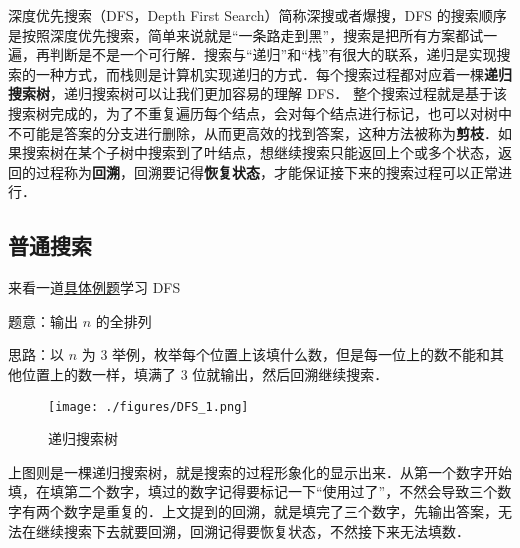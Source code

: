 
深度优先搜索（DFS，Depth First Search）简称深搜或者爆搜，DFS 的搜索顺序是按照深度优先搜索，简单来说就是“一条路走到黑”，搜索是把所有方案都试一遍，再判断是不是一个可行解．搜索与“递归”和“栈”有很大的联系，递归是实现搜索的一种方式，而栈则是计算机实现递归的方式．每个搜索过程都对应着一棵\textbf{递归搜索树}，递归搜索树可以让我们更加容易的理解 DFS．
整个搜索过程就是基于该搜索树完成的，为了不重复遍历每个结点，会对每个结点进行标记，也可以对树中不可能是答案的分支进行删除，从而更高效的找到答案，这种方法被称为\textbf{剪枝}．如果搜索树在某个子树中搜索到了叶结点，想继续搜索只能返回上个或多个状态，返回的过程称为\textbf{回溯}，回溯要记得\textbf{恢复状态}，才能保证接下来的搜索过程可以正常进行．


\subsection{普通搜索}
来看一道\href{https://www.luogu.com.cn/problem/P1706}{具体例题}学习 DFS

题意：输出 $n$ 的全排列

思路：以 $n$ 为 $3$ 举例，枚举每个位置上该填什么数，但是每一位上的数不能和其他位置上的数一样，填满了 $3$ 位就输出，然后回溯继续搜索．

\begin{figure}[ht]
\centering
\texttt{[image: ./figures/DFS\_1.png]}
\caption{递归搜索树} \label{DFS_fig1}
\end{figure}

上图则是一棵递归搜索树，就是搜索的过程形象化的显示出来．从第一个数字开始填，在填第二个数字，填过的数字记得要标记一下“使用过了”，不然会导致三个数字有两个数字是重复的．上文提到的回溯，就是填完了三个数字，先输出答案，无法在继续搜索下去就要回溯，回溯记得要恢复状态，不然接下来无法填数．

